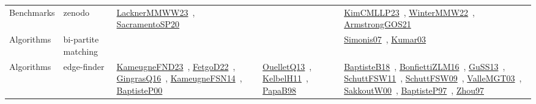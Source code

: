 {\begin{longtable}{lp{3cm}>{\raggedright\arraybackslash}p{6cm}>{\raggedright\arraybackslash}p{6cm}>{\raggedright\arraybackslash}p{8cm}}
Benchmarks & zenodo & \href{articles/LacknerMMWW23.pdf}{LacknerMMWW23}~\cite{LacknerMMWW23}, \href{articles/SacramentoSP20.pdf}{SacramentoSP20}~\cite{SacramentoSP20} &  & \href{papers/KimCMLLP23.pdf}{KimCMLLP23}~\cite{KimCMLLP23}, \href{papers/WinterMMW22.pdf}{WinterMMW22}~\cite{WinterMMW22}, \href{papers/ArmstrongGOS21.pdf}{ArmstrongGOS21}~\cite{ArmstrongGOS21}\\
Algorithms & bi-partite matching &  &  & \href{articles/Simonis07.pdf}{Simonis07}~\cite{Simonis07}, \href{papers/Kumar03.pdf}{Kumar03}~\cite{Kumar03}\\
Algorithms & edge-finder & \href{papers/KameugneFND23.pdf}{KameugneFND23}~\cite{KameugneFND23}, \href{articles/FetgoD22.pdf}{FetgoD22}~\cite{FetgoD22}, \href{papers/GingrasQ16.pdf}{GingrasQ16}~\cite{GingrasQ16}, \href{articles/KameugneFSN14.pdf}{KameugneFSN14}~\cite{KameugneFSN14}, \href{articles/BaptisteP00.pdf}{BaptisteP00}~\cite{BaptisteP00} & \href{papers/OuelletQ13.pdf}{OuelletQ13}~\cite{OuelletQ13}, \href{articles/KelbelH11.pdf}{KelbelH11}~\cite{KelbelH11}, \href{articles/PapaB98.pdf}{PapaB98}~\cite{PapaB98} & \href{articles/BaptisteB18.pdf}{BaptisteB18}~\cite{BaptisteB18}, \href{papers/BonfiettiZLM16.pdf}{BonfiettiZLM16}~\cite{BonfiettiZLM16}, \href{papers/GuSS13.pdf}{GuSS13}~\cite{GuSS13}, \href{articles/SchuttFSW11.pdf}{SchuttFSW11}~\cite{SchuttFSW11}, \href{papers/SchuttFSW09.pdf}{SchuttFSW09}~\cite{SchuttFSW09}, \href{papers/ValleMGT03.pdf}{ValleMGT03}~\cite{ValleMGT03}, \href{articles/SakkoutW00.pdf}{SakkoutW00}~\cite{SakkoutW00}, \href{papers/BaptisteP97.pdf}{BaptisteP97}~\cite{BaptisteP97}, \href{articles/Zhou97.pdf}{Zhou97}~\cite{Zhou97}\\

\end{longtable}}
